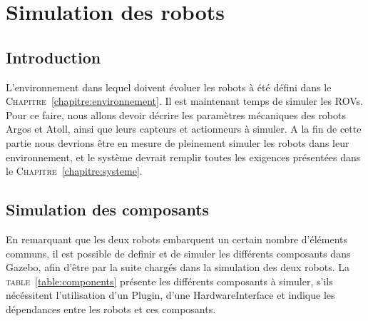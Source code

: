 \chapter{Simulation des robots}
\label{chapitre:robots}
	
	\section{Introduction}

		L'environnement dans lequel doivent évoluer les robots à été défini dans le \textsc{Chapitre}~\ref{chapitre:environnement}. Il est maintenant temps de simuler les \gls{ROV}s. Pour ce faire, nous allons devoir décrire les paramètres mécaniques des robots \gls{Argos} et \gls{Atoll}, ainsi que leurs capteurs et actionneurs à simuler. A la fin de cette partie nous devrions être en mesure de pleinement simuler les robots dans leur environnement, et le système devrait remplir toutes les exigences présentées dans le \textsc{Chapitre}~\ref{chapitre:systeme}.

	\section{Simulation des composants}
		En remarquant que les deux robots embarquent un certain nombre d'éléments communs, il est possible de definir et de simuler les différents composants dans \gls{Gazebo}, afin d'être par la suite chargés dans la simulation des deux robots. La \textsc{table}~\ref{table:components} présente les différents composants à simuler, s'ils nécéssitent l'utilisation d'un \gls{Plugin}, d'une \gls{HardwareInterface} et indique les dépendances entre les robots et ces composants.

